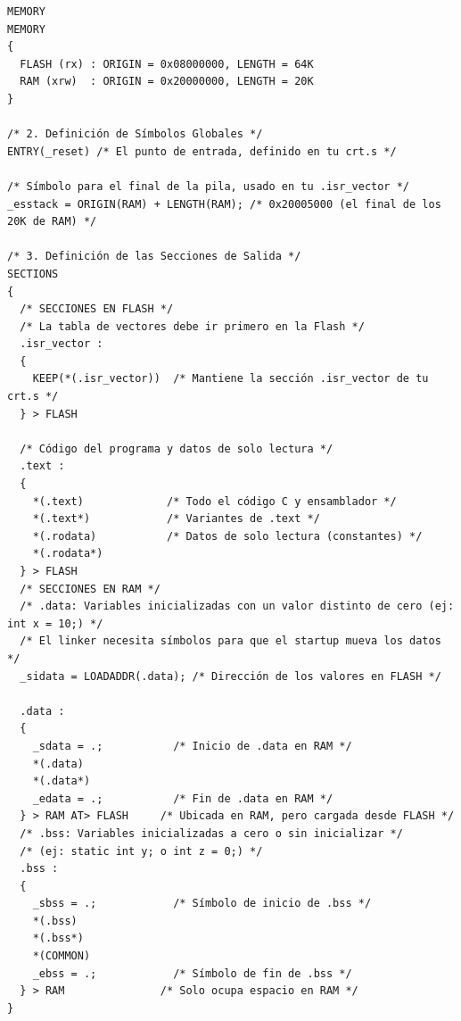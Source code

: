\begin{lstlisting}[language=Linker]
MEMORY
MEMORY
{
  FLASH (rx) : ORIGIN = 0x08000000, LENGTH = 64K
  RAM (xrw)  : ORIGIN = 0x20000000, LENGTH = 20K
}

/* 2. Definición de Símbolos Globales */
ENTRY(_reset) /* El punto de entrada, definido en tu crt.s */

/* Símbolo para el final de la pila, usado en tu .isr_vector */
_esstack = ORIGIN(RAM) + LENGTH(RAM); /* 0x20005000 (el final de los 20K de RAM) */

/* 3. Definición de las Secciones de Salida */
SECTIONS
{
  /* SECCIONES EN FLASH */
  /* La tabla de vectores debe ir primero en la Flash */
  .isr_vector :
  {
    KEEP(*(.isr_vector))  /* Mantiene la sección .isr_vector de tu crt.s */
  } > FLASH

  /* Código del programa y datos de solo lectura */
  .text :
  {
    *(.text)             /* Todo el código C y ensamblador */
    *(.text*)            /* Variantes de .text */
    *(.rodata)           /* Datos de solo lectura (constantes) */
    *(.rodata*)
  } > FLASH
  /* SECCIONES EN RAM */
  /* .data: Variables inicializadas con un valor distinto de cero (ej: int x = 10;) */
  /* El linker necesita símbolos para que el startup mueva los datos */
  _sidata = LOADADDR(.data); /* Dirección de los valores en FLASH */

  .data :
  {
    _sdata = .;           /* Inicio de .data en RAM */
    *(.data)
    *(.data*)
    _edata = .;           /* Fin de .data en RAM */
  } > RAM AT> FLASH     /* Ubicada en RAM, pero cargada desde FLASH */
  /* .bss: Variables inicializadas a cero o sin inicializar */
  /* (ej: static int y; o int z = 0;) */
  .bss :
  {
    _sbss = .;            /* Símbolo de inicio de .bss */
    *(.bss)
    *(.bss*)
    *(COMMON)
    _ebss = .;            /* Símbolo de fin de .bss */
  } > RAM               /* Solo ocupa espacio en RAM */
}

\end{lstlisting}

